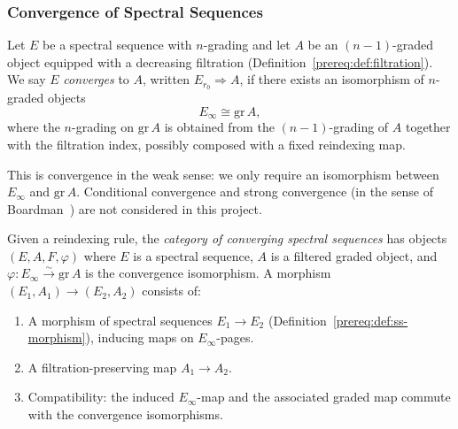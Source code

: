 \subsubsection{Convergence of Spectral Sequences}\label{sec:prereq-convergence}

\begin{definition}\label{prereq:def:convergence}
    \leanok
    Let $E$ be a spectral sequence with $n$-grading and let $A$ be an $(n-1)$-graded object equipped with a decreasing filtration (Definition~\ref{prereq:def:filtration}). We say $E$ \emph{converges} to $A$, written $E_{r_0} \Longrightarrow A$, if there exists an isomorphism of $n$-graded objects
    $$E_\infty \cong \mathrm{gr}\, A,$$
    where the $n$-grading on $\mathrm{gr}\, A$ is obtained from the $(n-1)$-grading of $A$ together with the filtration index, possibly composed with a fixed reindexing map.
\end{definition}

\begin{remark}\label{prereq:rem:weak-convergence}
    This is convergence in the weak sense: we only require an isomorphism between $E_\infty$ and $\mathrm{gr}\, A$. Conditional convergence and strong convergence (in the sense of Boardman~\cite{Boardman}) are not considered in this project.
\end{remark}

\begin{definition}\label{prereq:def:converging-ss-morphism}
    \leanok
    Given a reindexing rule, the \emph{category of converging spectral sequences} has objects $(E, A, F, \varphi)$ where $E$ is a spectral sequence, $A$ is a filtered graded object, and $\varphi: E_\infty \xrightarrow{\sim} \mathrm{gr}\, A$ is the convergence isomorphism. A morphism $(E_1, A_1) \to (E_2, A_2)$ consists of:
    \begin{enumerate}
        \item A morphism of spectral sequences $E_1 \to E_2$ (Definition~\ref{prereq:def:ss-morphism}), inducing maps on $E_\infty$-pages.
        \item A filtration-preserving map $A_1 \to A_2$.
        \item Compatibility: the induced $E_\infty$-map and the associated graded map commute with the convergence isomorphisms.
    \end{enumerate}
\end{definition}

